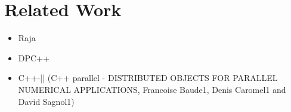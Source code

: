 \section{Related Work}\label{chap:related}
\begin{itemize}
	\item Raja
	\item DPC++
	\item C++-|| (C++ parallel - DISTRIBUTED OBJECTS FOR PARALLEL NUMERICAL APPLICATIONS, Francoise Baude1, Denis Caromel1 and David Sagnol1)
\end{itemize}

